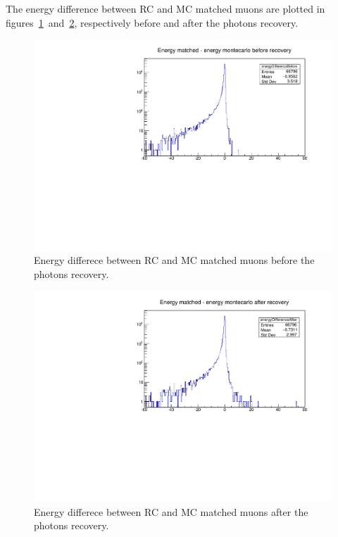 The energy difference between RC and MC matched muons are plotted in figures~\ref{04_muonsBeforePhotonsRecovery}~and~\ref{04_muonsAfterPhotonsRecovery}, respectively before and after the photons recovery.

\begin{figure} [htp]
\centering
\includegraphics[scale=0.7]{04_muonsBeforePhotonsRecovery.pdf}
\caption{Energy differece between RC and MC matched muons before the photons recovery.}
\label{04_muonsBeforePhotonsRecovery}
\end{figure}

\begin{figure} [htp]
\centering
\includegraphics[scale=0.7]{04_muonsAfterPhotonsRecovery.pdf}
\caption{Energy differece between RC and MC matched muons after the photons recovery.}
\label{04_muonsAfterPhotonsRecovery}
\end{figure}

